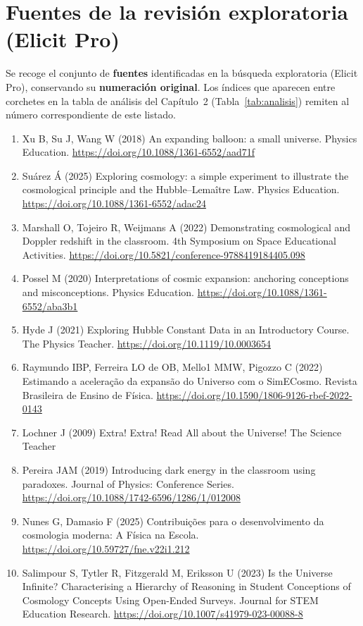 \chapter{Fuentes de la revisión exploratoria (Elicit Pro)}\label{cap:anexo1}

Se recoge el conjunto de \textbf{fuentes} identificadas en la búsqueda exploratoria (Elicit Pro), conservando su \textbf{numeración original}. Los índices que aparecen entre corchetes en la tabla de análisis del Capítulo~2 (Tabla~\ref{tab:analisis}) remiten al número correspondiente de este listado.

{\footnotesize
\begin{enumerate}\setlength{\itemsep}{2pt}
\item Xu B, Su J, Wang W (2018) An expanding balloon: a small universe. Physics Education. \url{https://doi.org/10.1088/1361-6552/aad71f}
\item Suárez Á (2025) Exploring cosmology: a simple experiment to illustrate the cosmological principle and the Hubble–Lemaître Law. Physics Education. \url{https://doi.org/10.1088/1361-6552/adac24}
\item Marshall O, Tojeiro R, Weijmans A (2022) Demonstrating cosmological and Doppler redshift in the classroom. 4th Symposium on Space Educational Activities. \url{https://doi.org/10.5821/conference-9788419184405.098}
\item Possel M (2020) Interpretations of cosmic expansion: anchoring conceptions and misconceptions. Physics Education. \url{https://doi.org/10.1088/1361-6552/aba3b1}
\item Hyde J (2021) Exploring Hubble Constant Data in an Introductory Course. The Physics Teacher. \url{https://doi.org/10.1119/10.0003654}
\item Raymundo IBP, Ferreira LO de OB, Mello1 MMW, Pigozzo C (2022) Estimando a aceleração da expansão do Universo com o SimECosmo. Revista Brasileira de Ensino de Física. \url{https://doi.org/10.1590/1806-9126-rbef-2022-0143}
\item Lochner J (2009) Extra! Extra! Read All about the Universe! The Science Teacher
\item Pereira JAM (2019) Introducing dark energy in the classroom using paradoxes. Journal of Physics: Conference Series. \url{https://doi.org/10.1088/1742-6596/1286/1/012008}
\item Nunes G, Damasio F (2025) Contribuições para o desenvolvimento da cosmologia moderna: A Física na Escola. \url{https://doi.org/10.59727/fne.v22i1.212}
\item Salimpour S, Tytler R, Fitzgerald M, Eriksson U (2023) Is the Universe Infinite? Characterising a Hierarchy of Reasoning in Student Conceptions of Cosmology Concepts Using Open-Ended Surveys. Journal for STEM Education Research. \url{https://doi.org/10.1007/s41979-023-00088-8}

\end{enumerate}}
